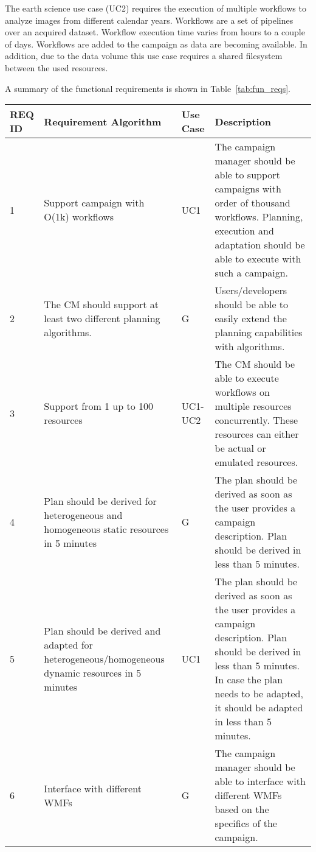 The earth science use case (UC2) requires the execution of multiple workflows to analyze images from different calendar years.
Workflows are a set of pipelines over an acquired dataset.
Workflow execution time varies from hours to a couple of days.
Workflows are added to the campaign as data are becoming available.
In addition, due to the data volume this use case requires a shared filesystem between the used resources.

A summary of the functional requirements is shown in Table~\ref{tab:fun_reqs}.

\begin{table}[t]
    \centering
    \scriptsize
    \begin{tabular}{@{}p{1.5cm}|p{2.8cm}p{1.5cm}p{6cm}@{}}
        \toprule
        \textbf{REQ ID} &\textbf{Requirement Algorithm} &\textbf{Use Case} & \textbf{Description} \\
        \midrule
         1 & 
         Support campaign with O(1k) workflows & 
         UC1 & 
         The campaign manager should be able to support campaigns with order of thousand workflows.
         Planning, execution and adaptation should be able to execute with such a campaign.\\
         2 & 
         The CM should support at least two different planning algorithms. & 
         G & 
         Users/developers should be able to easily extend the planning capabilities with algorithms.\\
         3 & 
         Support from 1 up to 100 resources & 
         UC1-UC2 & 
         The CM should be able to execute workflows on multiple resources concurrently.
         These resources can either be actual or emulated resources.\\
         4 & 
         Plan should be derived for heterogeneous and homogeneous static resources in 5 minutes & 
         G & 
         The plan should be derived as soon as the user provides a campaign description. 
         Plan should be derived in less than 5 minutes.\\
         5 & 
         Plan should be derived and adapted for heterogeneous/homogeneous dynamic resources in 5 minutes & 
         UC1 & 
         The plan should be derived as soon as the user provides a campaign description.
         Plan should be derived in less than 5 minutes.
         In case the plan needs to be adapted, it should be adapted in less than 5 minutes.\\
         6 & 
         Interface with different WMFs & 
         G & 
         The campaign manager should be able to interface with different WMFs based on the specifics of the campaign. \\

\end{tabular}
\end{table}
